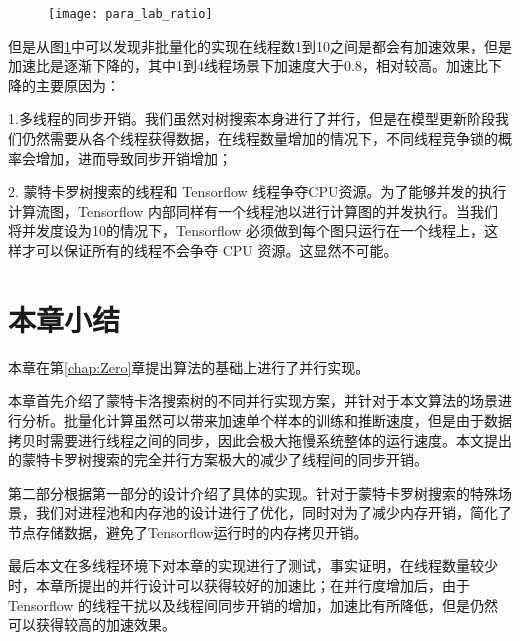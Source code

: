 \begin{figure}[!htbp]
    \centering
    \texttt{[image: para\_lab\_ratio]}
    \label{fig:para_lab_ratio}
\end{figure}

但是从图\ref{fig:para_lab_ratio}中可以发现非批量化的实现在线程数1到10之间是都会有加速效果，但是加速比是逐渐下降的，其中1到4线程场景下加速度大于0.8，相对较高。加速比下降的主要原因为：

1.多线程的同步开销。我们虽然对树搜索本身进行了并行，但是在模型更新阶段我们仍然需要从各个线程获得数据，在线程数量增加的情况下，不同线程竞争锁的概率会增加，进而导致同步开销增加；

2. 蒙特卡罗树搜索的线程和 Tensorflow 线程争夺CPU资源。为了能够并发的执行计算流图，Tensorflow 内部同样有一个线程池以进行计算图的并发执行。当我们将并发度设为10的情况下，Tensorflow 必须做到每个图只运行在一个线程上，这样才可以保证所有的线程不会争夺 CPU 资源。这显然不可能。

\section{本章小结}
本章在第\ref{chap:Zero}章提出算法的基础上进行了并行实现。

本章首先介绍了蒙特卡洛搜索树的不同并行实现方案，并针对于本文算法的场景进行分析。批量化计算虽然可以带来加速单个样本的训练和推断速度，但是由于数据拷贝时需要进行线程之间的同步，因此会极大拖慢系统整体的运行速度。本文提出的蒙特卡罗树搜索的完全并行方案极大的减少了线程间的同步开销。

第二部分根据第一部分的设计介绍了具体的实现。针对于蒙特卡罗树搜索的特殊场景，我们对进程池和内存池的设计进行了优化，同时对为了减少内存开销，简化了节点存储数据，避免了Tensorflow运行时的内存拷贝开销。

最后本文在多线程环境下对本章的实现进行了测试，事实证明，在线程数量较少时，本章所提出的并行设计可以获得较好的加速比；在并行度增加后，由于 Tensorflow 的线程干扰以及线程间同步开销的增加，加速比有所降低，但是仍然可以获得较高的加速效果。
